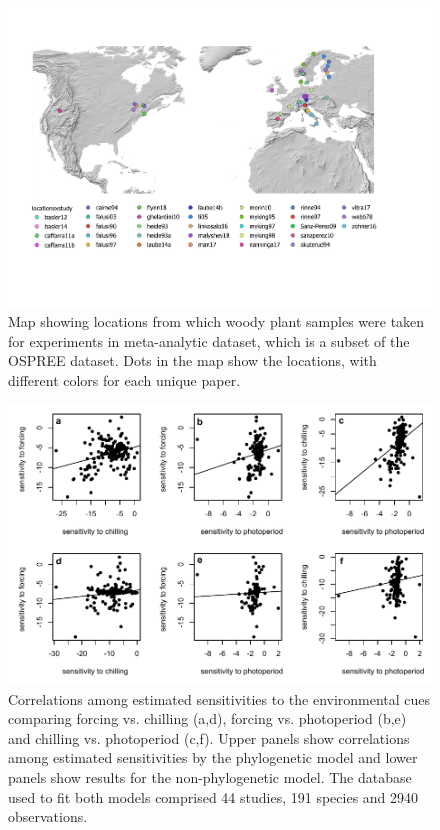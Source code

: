 \documentclass[11pt]{article}
\begin{document}
\begin{figure}
  \begin{center}
  \includegraphics[width=14cm]{../../analyses/phylogeny/figures/FigSXXXX_map_study_locations_legend.pdf}
  \caption{Map showing locations from which woody plant samples were taken for experiments in meta-analytic dataset, which is a subset of the OSPREE dataset. Dots in the map show the locations, with different colors for each unique paper.}  
  \label{fig:mapstudylocations}
  \end{center}
\end{figure}
\clearpage

\clearpage
\begin{figure}
  \begin{center}
  \includegraphics[width=16cm]{../../analyses/phylogeny/figures/FigSX_Sindromes_lamb_lamb0.pdf}
  \caption{Correlations among estimated sensitivities to the environmental cues comparing forcing vs. chilling (a,d), forcing vs. photoperiod (b,e) and chilling vs. photoperiod (c,f). Upper panels show correlations among estimated sensitivities by the phylogenetic model and lower panels show results for the non-phylogenetic model. The database used to fit both models comprised 44 studies, 191 species and 2940 observations.}
  \label{fig:suppcorrelsens}
  \end{center}
\end{figure}
\end{document}

